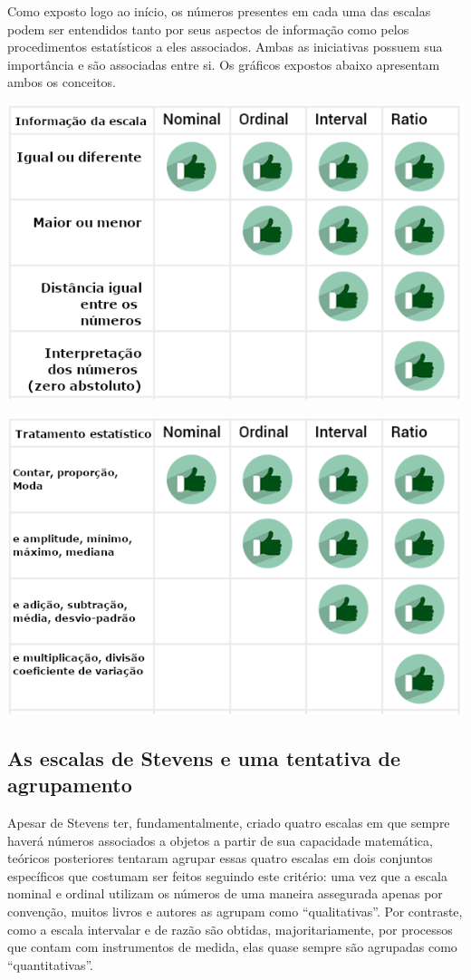 \documentclass[
]{book}
\begin{document}
Como exposto logo ao início, os números presentes em cada uma das
escalas podem ser entendidos tanto por seus aspectos de informação como
pelos procedimentos estatísticos a eles associados. Ambas as iniciativas
possuem sua importância e são associadas entre si. Os gráficos expostos
abaixo apresentam ambos os conceitos.

\includegraphics{./img/cap_escala_medida_informacao.png}

\includegraphics{./img/cap_escala_medida_analises.png}

\hypertarget{as-escalas-de-stevens-e-uma-tentativa-de-agrupamento}{%
\subsection{As escalas de Stevens e uma tentativa de
agrupamento}\label{as-escalas-de-stevens-e-uma-tentativa-de-agrupamento}}

Apesar de Stevens ter, fundamentalmente, criado quatro escalas em que
sempre haverá números associados a objetos a partir de sua capacidade
matemática, teóricos posteriores tentaram agrupar essas quatro escalas
em dois conjuntos específicos que costumam ser feitos seguindo este
critério: uma vez que a escala nominal e ordinal utilizam os números de
uma maneira assegurada apenas por convenção, muitos livros e autores as
agrupam como ``qualitativas''. Por contraste, como a escala intervalar e
de razão são obtidas, majoritariamente, por processos que contam com
instrumentos de medida, elas quase sempre são agrupadas como
``quantitativas''.
\end{document}
